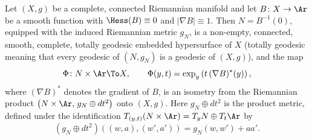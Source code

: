 \begin{proposition}
Let $(X,g)$ be a complete, connected Riemannian manifold and let
$B\colon X\to\Ar$ be a smooth function with $\Hess(B)\equiv0$ and
$|\nabla B|\equiv1$. Then $N=B^{-1}(0)$, equipped with the induced
Riemannian metric $g_N$, is a non-empty, connected, smooth, complete,
totally geodesic embedded hypersurface of $X$ (totally geodesic meaning
that every geodesic of $(N,g_N)$ is a geodesic of $(X,g)$), and the map
$$\Phi\colon N\times\Ar\To X,\qquad
\Phi(y,t)=\exp_y\left(t\,(\nabla B)^*(y)\right),$$
where $(\nabla B)^*$ denotes the gradient of $B$, is an isometry from
the Riemannian product $\left(N\times\Ar,\,g_N\oplus dt^2\right)$ onto
$(X,g)$. Here $g_N\oplus dt^2$ is the product metric, defined under the
identification $T_{(y,t)}(N\times\Ar)=T_yN\oplus T_t\Ar$ by
$$\left(g_N\oplus dt^2\right)\left((w,a),(w',a')\right)
=g_N(w,w')+aa' .$$
\end{proposition}

